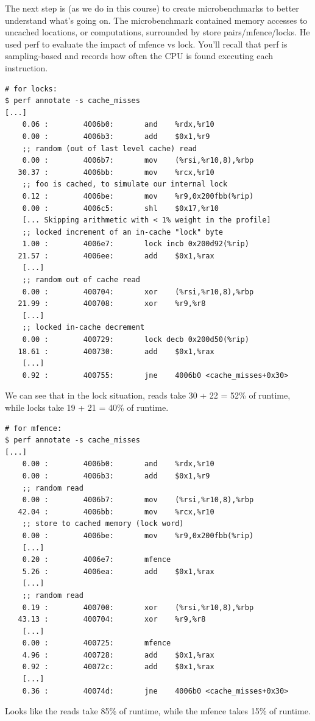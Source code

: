 The next step is (as we do in this course) to create microbenchmarks to better understand what's
going on. The microbenchmark contained memory accesses to uncached locations, or computations,
surrounded by store pairs/mfence/locks. He used perf to evaluate the impact of mfence vs lock.
You'll recall that perf is sampling-based and records how often the CPU is found executing each
instruction.

{\scriptsize
\begin{lstlisting}
# for locks:
$ perf annotate -s cache_misses
[...]
    0.06 :        4006b0:       and    %rdx,%r10
    0.00 :        4006b3:       add    $0x1,%r9
    ;; random (out of last level cache) read
    0.00 :        4006b7:       mov    (%rsi,%r10,8),%rbp
   30.37 :        4006bb:       mov    %rcx,%r10
    ;; foo is cached, to simulate our internal lock
    0.12 :        4006be:       mov    %r9,0x200fbb(%rip)
    0.00 :        4006c5:       shl    $0x17,%r10
    [... Skipping arithmetic with < 1% weight in the profile]
    ;; locked increment of an in-cache "lock" byte
    1.00 :        4006e7:       lock incb 0x200d92(%rip)
   21.57 :        4006ee:       add    $0x1,%rax
    [...]
    ;; random out of cache read
    0.00 :        400704:       xor    (%rsi,%r10,8),%rbp
   21.99 :        400708:       xor    %r9,%r8
    [...]
    ;; locked in-cache decrement
    0.00 :        400729:       lock decb 0x200d50(%rip)
   18.61 :        400730:       add    $0x1,%rax
    [...]
    0.92 :        400755:       jne    4006b0 <cache_misses+0x30>
\end{lstlisting}
}

We can see that in the lock situation, reads take 30 + 22 = 52\% of runtime,
while locks take 19 + 21 = 40\% of runtime.

{\scriptsize
\begin{lstlisting}
# for mfence:
$ perf annotate -s cache_misses
[...]
    0.00 :        4006b0:       and    %rdx,%r10
    0.00 :        4006b3:       add    $0x1,%r9
    ;; random read
    0.00 :        4006b7:       mov    (%rsi,%r10,8),%rbp
   42.04 :        4006bb:       mov    %rcx,%r10
    ;; store to cached memory (lock word)
    0.00 :        4006be:       mov    %r9,0x200fbb(%rip)
    [...]
    0.20 :        4006e7:       mfence 
    5.26 :        4006ea:       add    $0x1,%rax
    [...]
    ;; random read
    0.19 :        400700:       xor    (%rsi,%r10,8),%rbp
   43.13 :        400704:       xor    %r9,%r8
    [...]
    0.00 :        400725:       mfence 
    4.96 :        400728:       add    $0x1,%rax
    0.92 :        40072c:       add    $0x1,%rax
    [...]
    0.36 :        40074d:       jne    4006b0 <cache_misses+0x30>
\end{lstlisting}
}
Looks like the reads take 85\% of runtime,
while the mfence takes 15\% of runtime.

